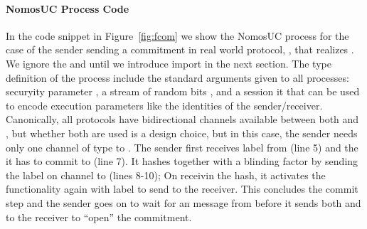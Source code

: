 \paragraph{NomosUC Process Code}
In the code snippet in Figure~\ref{fig:fcom} we show the NomosUC process for the case of the sender sending a commitment in real world protocol, \protcom, that realizes \Fcom.
We ignore the  and  until we introduce import in the next section. 
The type definition of the process include the standard arguments given to all processes: securyity parameter , a stream of random bits , and a session it  that can be used to encode execution parameters like the identities of the sender/receiver.
Canonically, all protocols have bidirectional channels available between both \Z and \F, but whether both are used is a design choice, but in this case, the sender needs only one channel  of type  to \Fcom. 
The sender first receives label  from \Z (line 5) and the  it has to commit to (line 7).
It hashes  together with a blinding factor  by sending the label  on channel  to \Fro (lines 8-10);
On receivin the hash, it activates the functionality again with label  to send  to the receiver. 
This concludes the commit step and the sender goes on to wait for an  message from \Z before it sends both  and  to the receiver to ``open'' the commitment.




